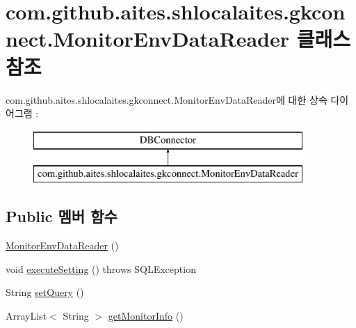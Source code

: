 \hypertarget{classcom_1_1github_1_1aites_1_1shlocalaites_1_1gkconnect_1_1_monitor_env_data_reader}{}\section{com.\+github.\+aites.\+shlocalaites.\+gkconnect.\+Monitor\+Env\+Data\+Reader 클래스 참조}
\label{classcom_1_1github_1_1aites_1_1shlocalaites_1_1gkconnect_1_1_monitor_env_data_reader}
com.\+github.\+aites.\+shlocalaites.\+gkconnect.\+Monitor\+Env\+Data\+Reader에 대한 상속 다이어그램 \+: \begin{figure}[H]
\begin{center}
\leavevmode
\includegraphics[height=2.000000cm]{classcom_1_1github_1_1aites_1_1shlocalaites_1_1gkconnect_1_1_monitor_env_data_reader}
\end{center}
\end{figure}
\subsection*{Public 멤버 함수}
\begin{DoxyCompactItemize}
\item 
\mbox{\hyperlink{classcom_1_1github_1_1aites_1_1shlocalaites_1_1gkconnect_1_1_monitor_env_data_reader_a9367b5b2a3621ea42b00639af1d1b9c7}{Monitor\+Env\+Data\+Reader}} ()
\item 
void \mbox{\hyperlink{classcom_1_1github_1_1aites_1_1shlocalaites_1_1gkconnect_1_1_monitor_env_data_reader_a3c7abf880200741a416ba05413babd71}{execute\+Setting}} ()  throws S\+Q\+L\+Exception 
\item 
String \mbox{\hyperlink{classcom_1_1github_1_1aites_1_1shlocalaites_1_1gkconnect_1_1_monitor_env_data_reader_ada8fb9c54e41e68d9d50b60fd848efad}{set\+Query}} ()
\item 
Array\+List$<$ String $>$ \mbox{\hyperlink{classcom_1_1github_1_1aites_1_1shlocalaites_1_1gkconnect_1_1_monitor_env_data_reader_acd79cdcfaeb3549ffef57d78b68e77d3}{get\+Monitor\+Info}} ()
\end{DoxyCompactItemize}
